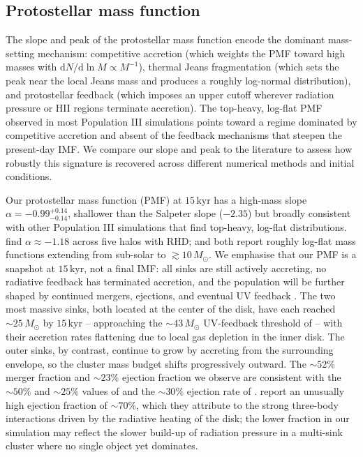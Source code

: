 \documentclass[twocolumn]{openjournal}
\newcommand{\Msun}{M_\odot}
\newcommand{\kyr}{\,\mathrm{kyr}}
\begin{document}
\subsection{Protostellar mass function}

The slope and peak of the protostellar mass function encode the dominant mass-setting mechanism: competitive accretion (which weights the PMF toward high masses with $\mathrm{d}N/\mathrm{d}\ln M \propto M^{-1}$), thermal Jeans fragmentation (which sets the peak near the local Jeans mass and produces a roughly log-normal distribution), and protostellar feedback (which imposes an upper cutoff wherever radiation pressure or HII regions terminate accretion).
The top-heavy, log-flat PMF observed in most Population III simulations points toward a regime dominated by competitive accretion and absent of the feedback mechanisms that steepen the present-day IMF.
We compare our slope and peak to the literature to assess how robustly this signature is recovered across different numerical methods and initial conditions.

Our protostellar mass function (PMF) at $15\kyr$ has a high-mass
slope $\alpha = -0.99^{+0.14}_{-0.14}$, shallower than the Salpeter
slope ($-2.35$) but broadly consistent with other Population III simulations
that find top-heavy, log-flat distributions.
\citet{latif_khochfar22} find $\alpha \approx -1.18$ across five
halos with RHD; \citet{stacy16} and \citet{greif11} both
report
roughly log-flat mass functions extending from sub-solar to
$\gtrsim 10\,\Msun$.
We emphasise that our PMF is a snapshot at $15\kyr$, not a final IMF:
all sinks are still actively accreting, no radiative feedback has
terminated accretion, and the population will be further shaped by
continued mergers, ejections, and eventual UV feedback
\citep{hosokawa11, hosokawa16, stacy16}.
The two most massive sinks, both located at the center of the disk,
have each reached $\sim 25\,\Msun$ by $15\kyr$ -- approaching the
$\sim 43\,\Msun$ UV-feedback threshold of \citet{hosokawa11} -- with
their accretion rates flattening due to local gas depletion in the
inner disk.
The outer sinks, by contrast, continue to grow by accreting from the
surrounding envelope, so the cluster mass budget shifts progressively
outward.
The $\sim 52\%$ merger fraction and $\sim 23\%$ ejection fraction
we observe are consistent with the $\sim 50\%$ and $\sim 25\%$
values of \citet{stacy12} and the $\sim 30\%$ ejection rate of
\citet{wollenberg20}.
\citet{latif_khochfar22} report an unusually high ejection fraction
of $\sim 70\%$, which they attribute to the strong three-body
interactions driven by the radiative heating of the disk; the lower
fraction in our simulation may reflect the slower build-up of
radiation pressure in a multi-sink cluster where no single object
yet dominates.
\end{document}

